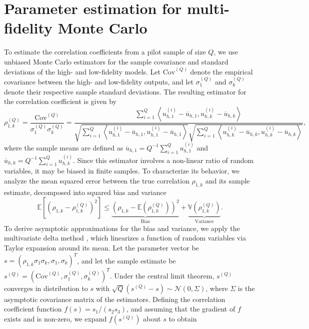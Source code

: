 \section{Parameter estimation for multi-fidelity Monte Carlo}\label{sec:Parameter_Estimation}

To estimate the correlation coefficients from a pilot sample of size $Q$, we use unbiased Monte Carlo estimators for the sample covariance and standard deviations of the high- and low-fidelity models. Let $\text{Cov}^{(Q)}$ denote the empirical covariance between the high- and low-fidelity outputs, and let $\sigma_1^{(Q)}$ and $\sigma_k^{(Q)}$ denote their respective sample standard deviations. The resulting estimator for the correlation coefficient is given by
%
\[
\rho_{1,k}^{(Q)} = \frac{\text{Cov}^{(Q)}}{\sigma_1^{(Q)}\sigma_k^{(Q)}} = \frac{\sum_{i=1}^Q\left\langle u_{h,1}^{(i)} - \overline{u}_{h,1},  u_{h,k}^{(i)} - \overline{u}_{h,k} \right\rangle}{\sqrt{\sum_{i=1}^Q \left\langle u_{h,1}^{(i)} - \overline{u}_{h,1}, u_{h,1}^{(i)} - \overline{u}_{h,1} \right\rangle} \sqrt{\sum_{i=1}^Q \left\langle u_{h,k}^{(i)} - \overline{ u}_{h,k}, u_{h,k}^{(i)} - \overline{u}_{h,k} \right\rangle}},
\]
%
where the sample means are defined as $\overline{u}_{h,1} = Q^{-1}\sum_{i=1}^Q u_{h,1}^{(i)}$ and $\overline{  u}_{h,k} = Q^{-1}\sum_{i=1}^Q u_{h,k}^{(i)}$. Since this estimator involves a non-linear ratio of random variables, it may be biased in finite samples. To characterize its behavior, we analyze the mean squared error between the true correlation $\rho_{1,k}$ and its sample estimate, decomposed into squared bias and variance
%
\begin{equation}
\label{eq:MSE_rho}
    \mathbb{E}\left[\left(\rho_{1,k} - \rho_{1,k}^{(Q)}\right)^2\right]\le \underbrace{\left(\rho_{1,k} - \mathbb{E}\left(\rho_{1,k}^{(Q)}\right)\right)^2}_{\text{Bias}}+\underbrace{\mathbb{V}\left(\rho_{1,k}^{(Q)}\right)}_{\text{Variance}}.
\end{equation}
%
To derive asymptotic approximations for the bias and variance, we apply the multivariate delta method \cite{Cr:1946,Oe:1992}, which linearizes a function of random variables via Taylor expansion around its mean. Let the parameter vector be $s = (\rho_{1,k}\sigma_1\sigma_k, \sigma_1, \sigma_k)^T$, and let the sample estimate be $s^{(Q)} = (\text{Cov}^{(Q)}, \sigma_1^{(Q)}, \sigma_k^{(Q)})^T$. Under the central limit theorem, $s^{(Q)}$ converges in distribution to $s$ with $\sqrt{Q}(s^{(Q)}-s)\sim \mathcal{N}(0,\Sigma)$, where $\Sigma$ is the asymptotic covariance matrix of the estimators. Defining the correlation coefficient function $f(s) = s_1 / (s_2 s_3)$, and assuming that the gradient of $f$ exists and is non-zero, we expand $f(s^{(Q)})$ about $s$ to obtain
